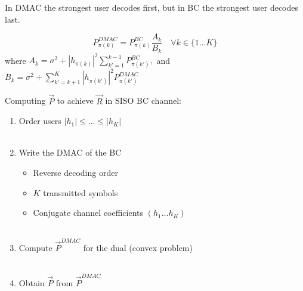 \documentclass[xcolor=dvipsnames,aspectratio=169]{beamer}
\begin{document}
{ \begin{remark}
    In DMAC the strongest user decodes first, but in BC the strongest user decodes last.
 \end{remark}

\begin{lemma}
 $$P^{DMAC}_{\pi(k)}=P^{BC}_{\pi(k)}\frac{A_k}{B_k}\quad \forall k\in\{1\dots K\}$$
 where $ A_k=\sigma^2+|h_{\pi(k)}|^2\sum_{k'=1}^{k-1}P_{\pi(k')}^{BC},$ and $ B_k=\sigma^2+\sum_{k'=k+1}^{K}|h_{\pi(k')}|^2P_{\pi(k')}^{DMAC}$
\end{lemma}
\pagebreak

Computing $\vec{P}$ to achieve $\vec{R}$ in SISO BC channel:
\begin{enumerate}
 \item Order users $|h_1|\leq \dots \leq |h_K|$\\ \ \\
 \item Write the DMAC of the BC 
    \begin{itemize}
     \item Reverse decoding order
     \item $K$ transmitted symbols 
     \item Conjugate channel coefficients $(h_1\dots h_K)$\\ \ \\
    \end{itemize}
 \item Compute $\vec{P}^{DMAC}$ for the dual (convex problem)\\ \ \\
 \item Obtain $\vec{P}$ from $\vec{P}^{DMAC}$ \\ \ \\
\end{enumerate}
}
\end{document}
